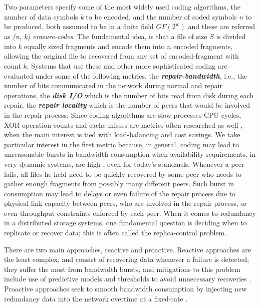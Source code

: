 \documentclass[runningheads]{llncs}
\begin{document}
Two parameters specify some of the most widely used coding algorithms, the number of data symbols \textit{k} to be encoded, and the number of coded symbols \textit{n} to be produced, both assumed to be in a finite field $GF(2^w)$ and these are referred as \textit{(n, k) erasure-codes}. The fundamental idea, is that a file of size $S$ is divided into $k$ equally sized fragments and encode them into $n$ encoded fragments, allowing the original file to recovered from any set of encoded-fragment with count $k$. Systems that use these and other more sophisticated coding are evaluated under some of the following metrics, the \textbf{\textit{repair-bandwidth}}, i.e., the number of bits communicated in the network during normal and repair operations, the \textbf{\textit{disk I/O}} which is the number of bits read from disk during each repair, the \textbf{\textit{repair locality}} which is the number of peers that would be involved in the repair process; Since coding algorithms are slow processes CPU cycles, XOR operation counts and cache misses are metrics often researched as well \cite{fast_coding}, when the main interest is tied with load-balancing and cost savings. We take particular interest in the first metric because, in general, coding may lead to unreasonable bursts in bandwidth consumption when availability requirements, in very dynamic systems, are high \cite{coding-problems}, even for today's standards. Whenever a peer fails, all files he held need to be quickly recovered by some peer who needs to gather enough fragments from possibly many different peers. Such burst in consumption may lead to delays or even failure of the repair process due to physical link capacity between peers, who are involved in the repair process, or even throughput constraints enforced by each peer. When it comes to redundancy in a distributed storage systems, one fundamental question is deciding when to replicate or recover data; this is often called the replica-control problem.

There are two main approaches, reactive and proactive. Reactive approaches are the least complex, and consist of recovering data whenever a failure is detected; they suffer the most from bandwidth bursts, and mitigations to this problem include use of predictive models and thresholds to avoid unnecessary recoveries \cite{lifetime-reactive, efficient-replica-mng-reactive}. Proactive approaches seek to smooth bandwidth consumption by injecting new redundancy data into the network overtime at a fixed-rate \cite{proactive-rep, reliability-without-availability}.
\end{document}
